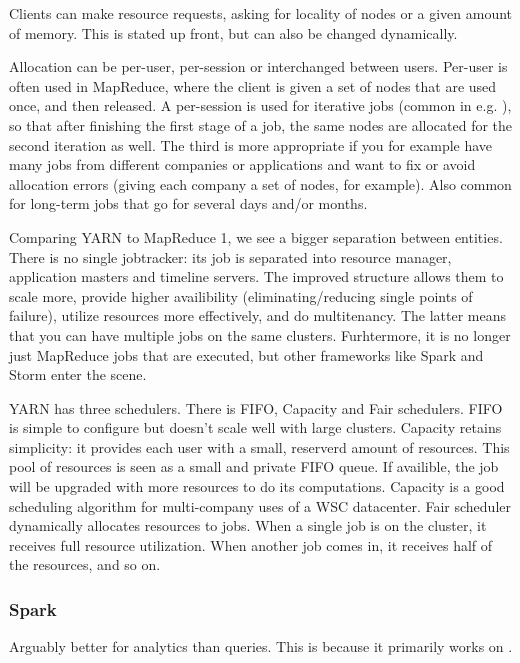 Clients can make resource requests, asking for locality of nodes or a given amount of memory.
This is stated up front, but can also be changed dynamically.

Allocation can be per-user, per-session or interchanged between users.
Per-user is often used in MapReduce, where the client is given a set of nodes
that are used once, and then released.
A per-session is used for iterative jobs (common in e.g. ), so that
after finishing the first stage of a job, the same nodes are allocated for the second iteration as well.
The third is more appropriate if you for example have many jobs from different companies or applications
and want to fix or avoid allocation errors (giving each company a set of nodes, for example).
Also common for long-term jobs that go for several days and/or months.

Comparing YARN to MapReduce 1, we see a bigger separation between entities. There 
is no single jobtracker: its job is separated into resource manager, application masters
and timeline servers. The improved structure allows them to scale more, provide higher
availibility (eliminating/reducing single points of failure), utilize resources more effectively,
and do multitenancy. The latter means that you can have multiple jobs on the same clusters. Furhtermore,
it is no longer just MapReduce jobs that are executed, but other frameworks like Spark and Storm enter the scene.

YARN has three schedulers. There is FIFO, Capacity and Fair schedulers.
FIFO is simple to configure but doesn't scale well with large clusters.
Capacity retains simplicity: it provides each user with a small, reserverd amount of resources.
This pool of resources is seen as a small and private FIFO queue. If availible, the job will be upgraded
with more resources to do its computations. Capacity is a good scheduling algorithm for multi-company uses
of a WSC datacenter.  Fair scheduler dynamically allocates resources to jobs.
When a single job is on the cluster, it receives full resource utilization. When another job comes in,
it receives half of the resources, and so on.



\subsubsection{Spark}\label{sec:spark}
Arguably better for analytics than queries. This is because it primarily works on 
.

